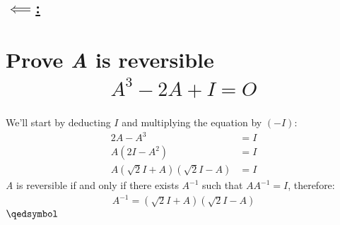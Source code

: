 \documentclass[a4paper, 12pt]{article}
\newcommand{\sub}[1]{\subsection{\underline{#1}}}
\newcommand{\eq}[1]{\begin{align*}#1\end{align*}}
\renewcommand{\qed}{\hfill\(\qedsymbol\)}
\begin{document}
\sub{$\impliedby$:}

\pagebreak

\setcounter{section}{18}
\section{Prove \textit{A} is reversible\eq{
    A^3-2A+I=O
}}
We'll start by deducting $I$ and multiplying the equation by $(-I)$:
\eq{
    2A-A^3&=I\\
    A(2I-A^2)&=I\\
    A(\sqrt{2}I+A)(\sqrt{2}I-A)&=I
}
\textit{A} is reversible if and only if there exists $A^{-1}$ such that $AA^{-1}=I$, therefore:
\eq{
    A^{-1}=(\sqrt{2}I+A)(\sqrt{2}I-A)
}
\qed

\end{document}
